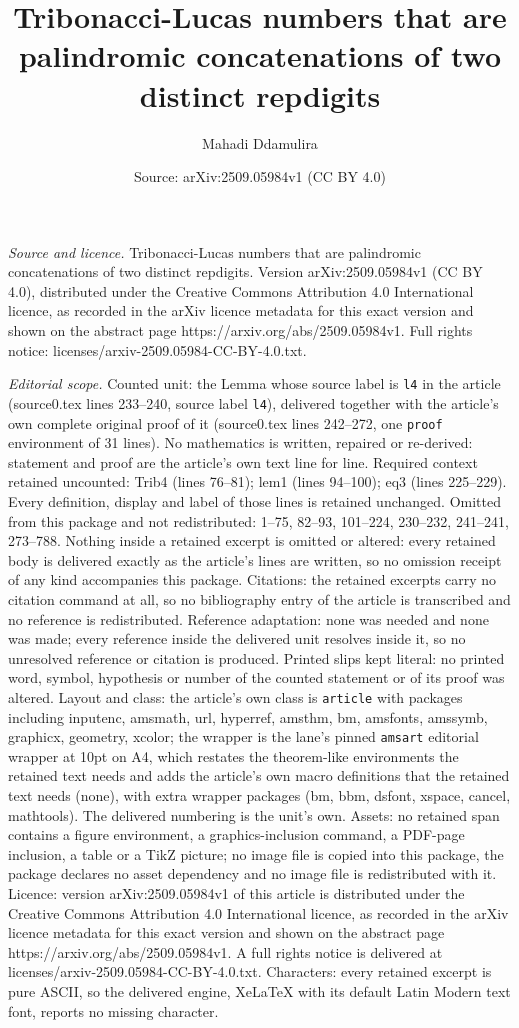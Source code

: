 \documentclass[10pt,a4paper]{amsart}
\title[Tribonacci-Lucas numbers that are palindromic concatenations]{Tribonacci-Lucas numbers that are palindromic concatenations of two distinct repdigits}
\author{Mahadi Ddamulira}
\date{Source: arXiv:2509.05984v1 (CC BY 4.0)}
\begin{document}
\maketitle

\noindent\emph{Source and licence.} Tribonacci-Lucas numbers that are palindromic concatenations of two distinct repdigits. Version arXiv:2509.05984v1 (CC BY 4.0), distributed under the Creative Commons Attribution 4.0 International licence, as recorded in the arXiv licence metadata for this exact version and shown on the abstract page https://arxiv.org/abs/2509.05984v1. Full rights notice: licenses/arxiv-2509.05984-CC-BY-4.0.txt.\par\smallskip

\noindent\textit{Editorial scope.} Counted unit: the Lemma whose source label is \texttt{l4} in the article (source0.tex lines 233--240, source label \texttt{l4}), delivered together with the article's own complete original proof of it (source0.tex lines 242--272, one \texttt{proof} environment of 31 lines). No mathematics is written, repaired or re-derived: statement and proof are the article's own text line for line. Required context retained uncounted: Trib4 (lines 76--81); lem1 (lines 94--100); eq3 (lines 225--229). Every definition, display and label of those lines is retained unchanged. Omitted from this package and not redistributed: 1--75, 82--93, 101--224, 230--232, 241--241, 273--788. Nothing inside a retained excerpt is omitted or altered: every retained body is delivered exactly as the article's lines are written, so no omission receipt of any kind accompanies this package. Citations: the retained excerpts carry no citation command at all, so no bibliography entry of the article is transcribed and no reference is redistributed. Reference adaptation: none was needed and none was made; every reference inside the delivered unit resolves inside it, so no unresolved reference or citation is produced. Printed slips kept literal: no printed word, symbol, hypothesis or number of the counted statement or of its proof was altered. Layout and class: the article's own class is \texttt{article} with packages including inputenc, amsmath, url, hyperref, amsthm, bm, amsfonts, amssymb, graphicx, geometry, xcolor; the wrapper is the lane's pinned \texttt{amsart} editorial wrapper at 10pt on A4, which restates the theorem-like environments the retained text needs and adds the article's own macro definitions that the retained text needs (none), with extra wrapper packages (bm, bbm, dsfont, xspace, cancel, mathtools). The delivered numbering is the unit's own. Assets: no retained span contains a figure environment, a graphics-inclusion command, a PDF-page inclusion, a table or a TikZ picture; no image file is copied into this package, the package declares no asset dependency and no image file is redistributed with it. Licence: version arXiv:2509.05984v1 of this article is distributed under the Creative Commons Attribution 4.0 International licence, as recorded in the arXiv licence metadata for this exact version and shown on the abstract page https://arxiv.org/abs/2509.05984v1. A full rights notice is delivered at licenses/arxiv-2509.05984-CC-BY-4.0.txt. Characters: every retained excerpt is pure ASCII, so the delivered engine, XeLaTeX with its default Latin Modern text font, reports no missing character.
\end{document}
